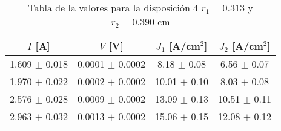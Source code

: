 \begin{table}[H]
    \centering
\begin{tabular}{cccc}
\toprule
$I$ [A] & $V$ [V] & $J_1$ [A/cm$^2$] & $J_2$ [A/cm$^2$] \\
\midrule
1.609 $\pm$ 0.018 & 0.0001 $\pm$ 0.0002 & 8.18 $\pm$ 0.08 & 6.56 $\pm$ 0.07 \\
1.970 $\pm$ 0.022 & 0.0002 $\pm$ 0.0002 & 10.01 $\pm$ 0.10 & 8.03 $\pm$ 0.08 \\
2.576 $\pm$ 0.028 & 0.0009 $\pm$ 0.0002 & 13.09 $\pm$ 0.13 & 10.51 $\pm$ 0.11 \\
2.963 $\pm$ 0.032 & 0.0013 $\pm$ 0.0002 & 15.06 $\pm$ 0.15 & 12.08 $\pm$ 0.12 \\
\bottomrule
\end{tabular}
    \caption{Tabla de la valores para la disposición 4 $r_1=0.313$ y $r_2= 0.390 $ cm }
    \label{Tab:VIJ_4}
\end{table}
